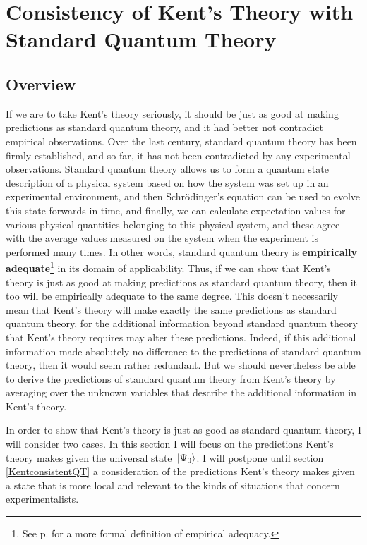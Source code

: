 \section{Consistency of Kent's Theory with Standard Quantum Theory\label{kentinterpretationconsistency}}
\subsection{Overview}
If we are to take Kent's theory seriously, it should be just as good at making predictions as standard quantum theory, and it had better not contradict empirical observations. Over the last century, standard quantum theory has been firmly established, and so far, it has not been contradicted by any experimental observations. Standard quantum theory allows us to form a quantum state description of a physical system based on how the system was set up in an experimental environment, and then Schr\"{o}dinger's equation can be used to evolve this state forwards in time, and finally, we can calculate expectation values for various physical quantities belonging to this physical system, and these agree with the average values measured on the system when the experiment is performed many times. In other words, standard quantum theory is \textbf{empirically adequate}\footnote{See p. \pageref{adeq} for a more formal definition of empirical adequacy.} in its domain of applicability. Thus, if we can show that Kent's theory is just as good at making predictions as standard quantum theory, then it too will be empirically adequate to the same degree. This doesn't necessarily mean that Kent's theory will make exactly the same predictions as standard quantum theory, for the additional information  beyond standard quantum theory that Kent's theory requires may alter these predictions. Indeed, if this additional information made absolutely no difference to the predictions of standard quantum theory, then it would seem rather redundant. But we should nevertheless be able to derive the predictions of standard quantum theory from Kent's theory by averaging over the unknown variables that describe the additional information in Kent's theory. 

In order to show that Kent's theory is just as good as standard quantum theory, I will consider two cases. In this section I will focus on the predictions Kent's theory makes given the universal state $\ket*{\Psi_0}$. I will postpone until section \ref{KentconsistentQT} a consideration of the predictions Kent's theory makes given a state that is more local and relevant to the kinds of situations that concern experimentalists. 

